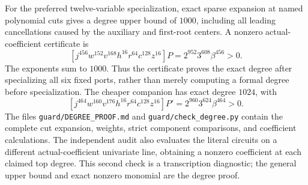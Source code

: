 For the preferred twelve-variable specialization, exact sparse expansion
at named polynomial cuts gives a degree upper bound of $1000$, including
all leading cancellations caused by the auxiliary and first-root centers.
A nonzero actual-coefficient certificate is
\[
 [j^{456}w^{152}v^{168}h^{16}r^{64}c^{128}z^{16}]P
   =2^{952}3^{608}\beta^{456}>0.
\]
The exponents sum to $1000$. Thus the certificate proves the exact degree
after specializing all six fixed ports, rather than merely computing a
formal degree before specialization. The cheaper companion has exact degree
$1024$, with
\[
 [j^{464}w^{160}v^{176}h^{16}r^{64}c^{128}z^{16}]P'
   =2^{960}3^{624}\beta^{464}>0.
\]
The files \texttt{guard/DEGREE\_PROOF.md} and
\texttt{guard/check\_degree.py} contain the complete cut expansion,
weights, strict component comparisons, and coefficient calculations.
The independent audit also evaluates the literal circuits on a different
actual-coefficient univariate line, obtaining a nonzero coefficient at each
claimed top degree. This second check is a transcription diagnostic;
the general upper bound and exact nonzero monomial are the degree proof.

